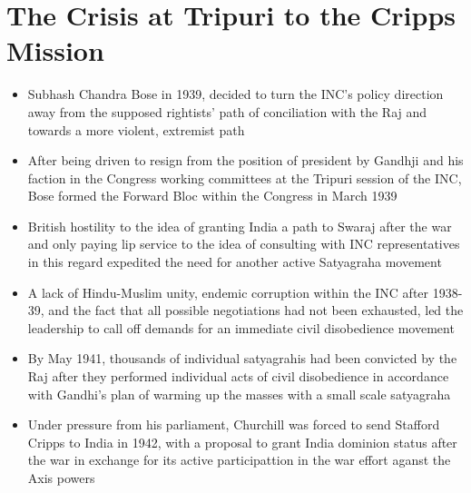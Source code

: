 \section{The Crisis at Tripuri to the Cripps Mission}
\begin{itemize}
    \item Subhash Chandra Bose in 1939, decided to turn the INC's policy direction away from the supposed rightists' path of conciliation with the Raj and towards a more violent, extremist path
    \item After being driven to resign from the position of president by Gandhji and his faction in the Congress working committees at the Tripuri session of the INC, Bose formed the Forward Bloc within the Congress in March 1939
    \item British hostility to the idea of granting India a path to Swaraj after the war and only paying lip service to the idea of consulting with INC representatives in this regard expedited the need for another active Satyagraha movement
    \item A lack of Hindu-Muslim unity, endemic corruption within the INC after 1938-39, and the fact that all possible negotiations had not been exhausted, led the leadership to call off demands for an immediate civil disobedience movement
    \item By May 1941, thousands of individual satyagrahis had been convicted by the Raj after they performed individual acts of civil disobedience in accordance with Gandhi's plan of warming up the masses with a small scale satyagraha
    \item Under pressure from his parliament, Churchill was forced to send Stafford Cripps to India in 1942, with a proposal to grant India dominion status after the war in exchange for its active participattion in the war effort aganst the Axis powers
\end{itemize}

